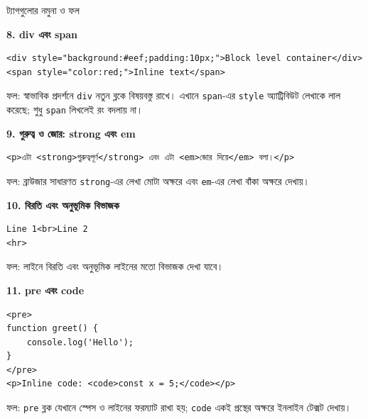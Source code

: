 \begin{examplebox}{ট্যাগগুলোর নমুনা ও ফল}
\vspace{6pt}
\par\noindent\begin{minipage}{\linewidth}
\textbf{8. div এবং span}\\
\begin{verbatim}
<div style="background:#eef;padding:10px;">Block level container</div>
<span style="color:red;">Inline text</span>
\end{verbatim}
ফল: স্বাভাবিক প্রদর্শনে \texttt{div} নতুন ব্লকে বিষয়বস্তু রাখে। এখানে \texttt{span}-এর \texttt{style} অ্যাট্রিবিউট লেখাকে লাল করেছে; শুধু \texttt{span} লিখলেই রং বদলায় না।
\end{minipage}\par

\vspace{6pt}
\par\noindent\begin{minipage}{\linewidth}
\textbf{9. গুরুত্ব ও জোর: strong এবং em}\\
\begin{chFourBanglaCode}
\begin{verbatim}
<p>এটা <strong>গুরুত্বপূর্ণ</strong> এবং এটা <em>জোর দিয়ে</em> বলা।</p>
\end{verbatim}
\end{chFourBanglaCode}
ফল: ব্রাউজার সাধারণত \texttt{strong}-এর লেখা মোটা অক্ষরে এবং \texttt{em}-এর লেখা বাঁকা অক্ষরে দেখায়।
\end{minipage}\par

\vspace{6pt}
\par\noindent\textbf{10. বিরতি এবং অনুভূমিক বিভাজক}\par
\begin{minipage}[t]{.50\linewidth}\vspace{0pt}
\begin{verbatim}
Line 1<br>Line 2
<hr>
\end{verbatim}
\end{minipage}\hfill
\begin{minipage}[t]{.46\linewidth}\vspace{0pt}
ফল: লাইনে বিরতি এবং অনুভূমিক লাইনের মতো বিভাজক দেখা যাবে।
\end{minipage}



\vspace{6pt}
\par\noindent\begin{minipage}{\linewidth}
\textbf{11. pre এবং code}\\
\begin{verbatim}
<pre>
function greet() {
	console.log('Hello');
}
</pre>
<p>Inline code: <code>const x = 5;</code></p>
\end{verbatim}
ফল: \texttt{pre} ব্লক যেখানে স্পেস ও লাইনের ফরম্যাট রাখা হয়; \texttt{code} একই প্রস্থের অক্ষরে ইনলাইন টেক্সট দেখায়।
\end{minipage}\par


\end{examplebox}
